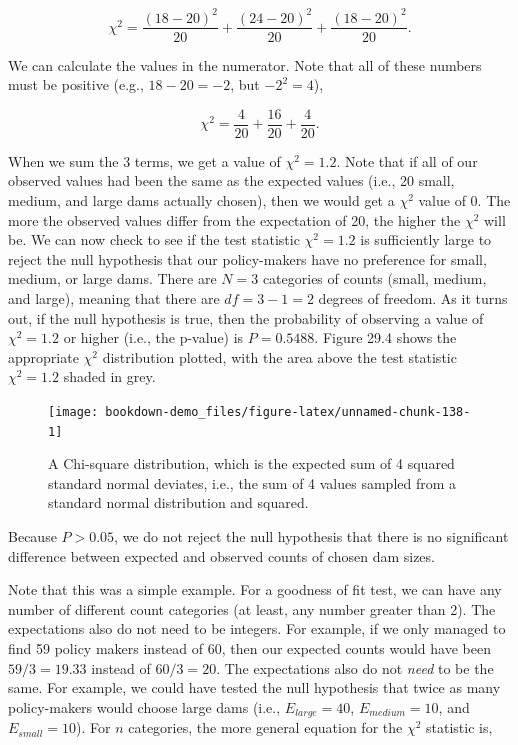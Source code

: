 \documentclass[
]{scrbook}
\begin{document}
\[\chi^{2} = \frac{(18 - 20)^{2}}{20} + \frac{(24 - 20)^{2}}{20} + \frac{(18 - 20)^{2}}{20}.\]

We can calculate the values in the numerator.
Note that all of these numbers must be positive (e.g., \(18 - 20 = -2\), but \(-2^{2} = 4\)),

\[\chi^{2} = \frac{4}{20} + \frac{16}{20} + \frac{4}{20}.\]

When we sum the 3 terms, we get a value of \(\chi^{2} = 1.2\).
Note that if all of our observed values had been the same as the expected values (i.e., 20 small, medium, and large dams actually chosen), then we would get a \(\chi^{2}\) value of 0.
The more the observed values differ from the expectation of 20, the higher the \(\chi^{2}\) will be.
We can now check to see if the test statistic \(\chi^{2} = 1.2\) is sufficiently large to reject the null hypothesis that our policy-makers have no preference for small, medium, or large dams.
There are \(N = 3\) categories of counts (small, medium, and large), meaning that there are \(df = 3 - 1 = 2\) degrees of freedom.
As it turns out, if the null hypothesis is true, then the probability of observing a value of \(\chi^{2} = 1.2\) or higher (i.e., the p-value) is \(P = 0.5488\).
Figure 29.4 shows the appropriate \(\chi^{2}\) distribution plotted, with the area above the test statistic \(\chi^{2} = 1.2\) shaded in grey.

\begin{figure}
\texttt{[image: bookdown-demo\_files/figure-latex/unnamed-chunk-138-1]} \caption{A Chi-square distribution, which is the expected sum of 4 squared standard normal deviates, i.e., the sum of 4 values sampled from a standard normal distribution and squared.}\label{fig:unnamed-chunk-138}
\end{figure}

Because \(P > 0.05\), we do not reject the null hypothesis that there is no significant difference between expected and observed counts of chosen dam sizes.

Note that this was a simple example.
For a goodness of fit test, we can have any number of different count categories (at least, any number greater than 2).
The expectations also do not need to be integers.
For example, if we only managed to find 59 policy makers instead of 60, then our expected counts would have been \(59/3 = 19.33\) instead of \(60/3 = 20\).
The expectations also do not \emph{need} to be the same.
For example, we could have tested the null hypothesis that twice as many policy-makers would choose large dams (i.e., \(E_{large} = 40\), \(E_{medium} = 10\), and \(E_{small} = 10\)).
For \(n\) categories, the more general equation for the \(\chi^{2}\) statistic is,
\end{document}
